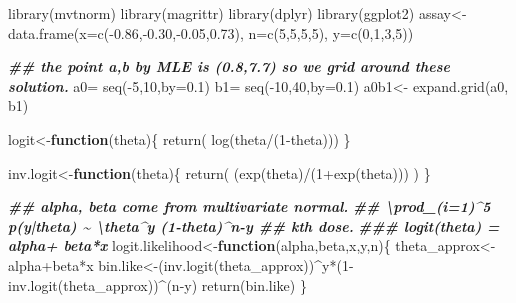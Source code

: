 \documentclass[
]{book}
\newenvironment{Shaded}{\begin{snugshade}}{\end{snugshade}}
\newcommand{\AttributeTok}[1]{\textcolor[rgb]{0.77,0.63,0.00}{#1}}
\newcommand{\ControlFlowTok}[1]{\textcolor[rgb]{0.13,0.29,0.53}{\textbf{#1}}}
\newcommand{\DecValTok}[1]{\textcolor[rgb]{0.00,0.00,0.81}{#1}}
\newcommand{\DocumentationTok}[1]{\textcolor[rgb]{0.56,0.35,0.01}{\textbf{\textit{#1}}}}
\newcommand{\FloatTok}[1]{\textcolor[rgb]{0.00,0.00,0.81}{#1}}
\newcommand{\FunctionTok}[1]{\textcolor[rgb]{0.00,0.00,0.00}{#1}}
\newcommand{\NormalTok}[1]{#1}
\newcommand{\OtherTok}[1]{\textcolor[rgb]{0.56,0.35,0.01}{#1}}
\newcommand{\SpecialCharTok}[1]{\textcolor[rgb]{0.00,0.00,0.00}{#1}}
\theoremstyle{definition}
\theoremstyle{definition}
\theoremstyle{definition}
\theoremstyle{definition}
\theoremstyle{remark}
\begin{document}
\begin{Shaded}
\begin{Highlighting}[]
 \FunctionTok{library}\NormalTok{(mvtnorm)}
 \FunctionTok{library}\NormalTok{(magrittr)}
 \FunctionTok{library}\NormalTok{(dplyr)}
 \FunctionTok{library}\NormalTok{(ggplot2)}
\NormalTok{ assay}\OtherTok{\textless{}{-}}\FunctionTok{data.frame}\NormalTok{(}\AttributeTok{x=}\FunctionTok{c}\NormalTok{(}\SpecialCharTok{{-}}\FloatTok{0.86}\NormalTok{,}\SpecialCharTok{{-}}\FloatTok{0.30}\NormalTok{,}\SpecialCharTok{{-}}\FloatTok{0.05}\NormalTok{,}\FloatTok{0.73}\NormalTok{), }\AttributeTok{n=}\FunctionTok{c}\NormalTok{(}\DecValTok{5}\NormalTok{,}\DecValTok{5}\NormalTok{,}\DecValTok{5}\NormalTok{,}\DecValTok{5}\NormalTok{), }\AttributeTok{y=}\FunctionTok{c}\NormalTok{(}\DecValTok{0}\NormalTok{,}\DecValTok{1}\NormalTok{,}\DecValTok{3}\NormalTok{,}\DecValTok{5}\NormalTok{))}

 \DocumentationTok{\#\# the point a,b by MLE is (0.8,7.7) so we grid around these solution.}
\NormalTok{ a0}\OtherTok{=} \FunctionTok{seq}\NormalTok{(}\SpecialCharTok{{-}}\DecValTok{5}\NormalTok{,}\DecValTok{10}\NormalTok{,}\AttributeTok{by=}\FloatTok{0.1}\NormalTok{)}
\NormalTok{ b1}\OtherTok{=} \FunctionTok{seq}\NormalTok{(}\SpecialCharTok{{-}}\DecValTok{10}\NormalTok{,}\DecValTok{40}\NormalTok{,}\AttributeTok{by=}\FloatTok{0.1}\NormalTok{)}
\NormalTok{  a0b1}\OtherTok{\textless{}{-}} \FunctionTok{expand.grid}\NormalTok{(a0, b1)}

\NormalTok{logit}\OtherTok{\textless{}{-}}\ControlFlowTok{function}\NormalTok{(theta)\{}
  \FunctionTok{return}\NormalTok{( }\FunctionTok{log}\NormalTok{(theta}\SpecialCharTok{/}\NormalTok{(}\DecValTok{1}\SpecialCharTok{{-}}\NormalTok{theta)))}
\NormalTok{\}}

\NormalTok{inv.logit}\OtherTok{\textless{}{-}}\ControlFlowTok{function}\NormalTok{(theta)\{}
  \FunctionTok{return}\NormalTok{( (}\FunctionTok{exp}\NormalTok{(theta)}\SpecialCharTok{/}\NormalTok{(}\DecValTok{1}\SpecialCharTok{+}\FunctionTok{exp}\NormalTok{(theta)))  )}
\NormalTok{\}}

\DocumentationTok{\#\# alpha, beta come from multivariate normal.}
 \DocumentationTok{\#\# \textbackslash{}prod\_(i=1)\^{}5 p(y|theta) \textasciitilde{} \textbackslash{}theta\^{}y (1{-}theta)\^{}n{-}y \#\# kth dose. }
  \DocumentationTok{\#\#\# logit(theta) = alpha+ beta*x}
\NormalTok{logit.likelihood}\OtherTok{\textless{}{-}}\ControlFlowTok{function}\NormalTok{(alpha,beta,x,y,n)\{}
\NormalTok{   theta\_approx}\OtherTok{\textless{}{-}}\NormalTok{ alpha}\SpecialCharTok{+}\NormalTok{beta}\SpecialCharTok{*}\NormalTok{x}
\NormalTok{   bin.like}\OtherTok{\textless{}{-}}\NormalTok{(}\FunctionTok{inv.logit}\NormalTok{(theta\_approx))}\SpecialCharTok{\^{}}\NormalTok{y}\SpecialCharTok{*}\NormalTok{(}\DecValTok{1}\SpecialCharTok{{-}}\FunctionTok{inv.logit}\NormalTok{(theta\_approx))}\SpecialCharTok{\^{}}\NormalTok{(n}\SpecialCharTok{{-}}\NormalTok{y)}
   \FunctionTok{return}\NormalTok{(bin.like)}
\NormalTok{\}  }


\end{Highlighting}
\end{Shaded}
\end{document}
